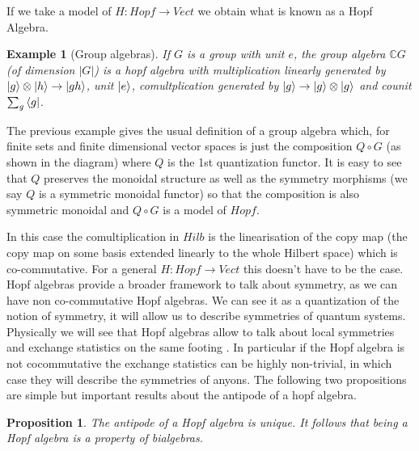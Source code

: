 \documentclass{article}
\newtheorem{example}{Example}
\newtheorem{proposition}[theorem]{Proposition}
\begin{document}
If we take a model of $H:Hopf \rightarrow Vect$ we obtain what is known as a Hopf Algebra.
\begin{example}[Group algebras]
	If $G$ is a group with unit $e$, the group algebra $\mathbb{C}G$ (of dimension $|G|$) is a hopf algebra with multiplication linearly generated by $\ket{g}\otimes \ket{h} \rightarrow \ket{gh}$, unit $\ket{e}$, comultplication generated by $\ket{g} \rightarrow \ket{g} \otimes \ket{g}$ and counit $\sum_g \bra{g}$.
\end{example}
The previous example gives the usual definition of a group algebra which, for finite sets and finite dimensional vector spaces is just the composition $Q \circ G$ (as shown in the diagram) where $Q$ is the 1st quantization functor. It is easy to see that $Q$ preserves the monoidal structure as well as the symmetry morphisms (we say $Q$ is a symmetric monoidal functor) so that the composition is also symmetric monoidal and $Q \circ G$ is a model of $Hopf$.
\begin{center}
\end{center}
In this case the comultiplication in $Hilb$ is the linearisation of the copy map (the copy map on some basis extended linearly to the whole Hilbert space) which is co-commutative. For a general $H:Hopf \rightarrow Vect$ this doesn't have to be the case. Hopf algebras provide a broader framework to talk about symmetry, as we can have non co-commutative Hopf algebras. We can see it as a quantization of the notion of symmetry, it will allow us to describe symmetries of quantum systems. Physically we will see that Hopf algebras allow to talk about local symmetries and exchange statistics on the same footing \cite{Slingerland02}. In particular if the Hopf algebra is not cocommutative the exchange statistics can be highly non-trivial, in which case they will describe the symmetries of anyons.
The following two propositions are simple but important results about the antipode of a hopf algebra.
\begin{proposition}
	The antipode of a Hopf algebra is unique. It follows that being a Hopf algebra is a property of bialgebras. 
\end{proposition}
\end{document}
